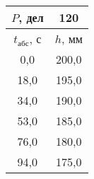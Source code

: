 \begin{tabular}[t]{|c|c|}
\hline
$P$, дел & 120 \\
\hline
$t_{абс}$, с & $h$, мм \\ 
\hline
0,0 & 200,0 \\ 
18,0 & 195,0 \\ 
34,0 & 190,0 \\ 
53,0 & 185,0 \\ 
76,0 & 180,0 \\ 
94,0 & 175,0 \\ 
\hline
\end{tabular}